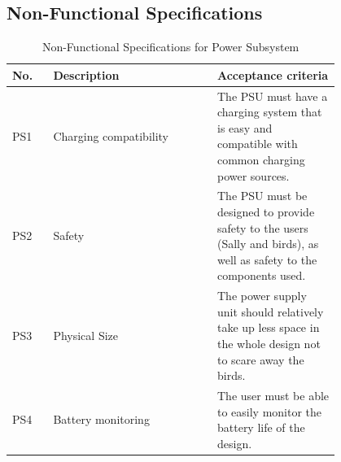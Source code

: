 \documentclass[class=report,11pt,crop=false]{standalone}
\begin{document}
	\subsection{Non-Functional Specifications}
	
			\begin{table}[h!]
				\centering
				\caption{Non-Functional Specifications for Power Subsystem}
				\label{tab:P1}
				\begin{tabularx}{0.8\textwidth}{|>{\centering\arraybackslash}m{0.1\linewidth}|>{\centering\arraybackslash}m{0.4\linewidth}|>{\centering\arraybackslash}m{0.3\linewidth}|}
					\hline
					\textbf{No.} & \textbf{Description} & \textbf{Acceptance criteria} \\
					\hline
					PS1 & Charging compatibility & The PSU must have a charging system that is easy and compatible with common charging power sources. \\
					\hline
					PS2 & Safety & The PSU must be designed to provide safety to the users (Sally and birds), as well as safety to the components used. \\
					\hline
					PS3 & Physical Size & The power supply unit should relatively take up less space in the whole design not to scare away the birds. \\
					\hline
					PS4 & Battery monitoring & The user must be able to easily monitor the battery life of the design. \\
					\hline
				\end{tabularx}
			\end{table}
\end{document}
